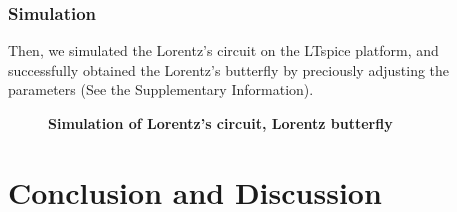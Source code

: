 \documentclass[10pt,a4paper,twocolumn,twoside,UTF8]{article}
\begin{document}
		\subsubsection{Simulation}
		Then, we simulated the Lorentz's circuit on the LTspice platform, and successfully obtained the Lorentz's butterfly
		by preciously adjusting the parameters (See the Supplementary Information).
		\begin{figure}[htbp]
			\centering
			\caption{\textbf{Simulation of Lorentz's circuit, Lorentz butterfly}}
			\label{fig.5.1}
		\end{figure}



\section{Conclusion and Discussion}
\end{document}
